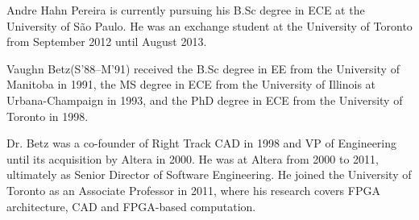 \documentclass[journal]{IEEEtran}
\begin{document}
\begin{IEEEbiography}{Andre Hahn Pereira} is currently pursuing his B.Sc degree in ECE at the University of S\~{a}o Paulo. He was an exchange student at the University of Toronto from September 2012 until August 2013.
\end{IEEEbiography}

\begin{IEEEbiography}{Vaughn Betz}(S'88--M'91) received the B.Sc degree in EE from the University of Manitoba in 1991, the MS degree in ECE from the University of Illinois at Urbana-Champaign in 1993, and the PhD degree in ECE from the University of Toronto in 1998.

Dr. Betz was a co-founder of Right Track CAD in 1998 and VP of Engineering until its acquisition by Altera in 2000. He was at Altera from 2000 to 2011, ultimately as Senior Director of Software Engineering. He joined the University of Toronto as an Associate Professor in 2011, where his research covers FPGA architecture, CAD and FPGA-based computation.
\end{IEEEbiography}





\end{document}
